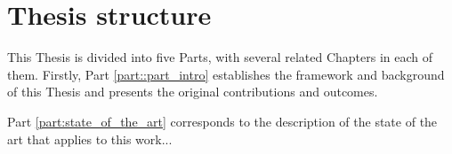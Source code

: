 \chapter{Thesis structure}
\label{sect::structure}

This Thesis is divided into five Parts, with several related Chapters in each of them. Firstly, Part \ref{part::part_intro} establishes the framework and background of this Thesis and presents the original contributions and outcomes.

Part \ref{part:state_of_the_art} corresponds to the description of the state of the art that applies to this work...